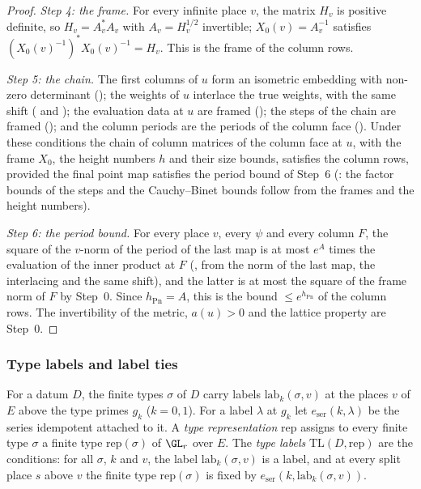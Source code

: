 \begin{proof}
\emph{Step 4: the frame.} For every infinite place $v$, the matrix $H_v$ is positive definite, so $H_v=A_v^*A_v$ with
$A_v=H_v^{1/2}$ invertible; $X_0(v)=A_v^{-1}$ satisfies $(X_0(v)^{-1})^*X_0(v)^{-1}=H_v$. This is the frame of the column rows.

\emph{Step 5: the chain.} The first columns of $u$ form an isometric embedding with non-zero determinant
(); the weights of $u$ interlace the true weights, with the same shift
( and );
the evaluation data at $u$ are framed (); the steps of the chain are framed
(); and the column periods are the periods of the column face
(). Under these conditions the chain of column matrices of the column face at $u$, with the
frame $X_0$, the height numbers $h$ and their size bounds, satisfies the column rows, provided the final point map satisfies the
period bound of Step~6 (: the factor bounds of the steps and the
Cauchy--Binet bounds follow from the frames and the height numbers).

\emph{Step 6: the period bound.} For every place $v$, every $\psi$ and every column $F$, the square of the $v$-norm of the period of
the last map is at most $e^{A}$ times the evaluation of the inner product at $F$
(, from the norm of the last map, the interlacing and the same shift), and the latter is
at most the square of the frame norm of $F$ by Step~0. Since $h_{\mathrm{Pn}}=A$, this is the bound
$\le e^{h_{\mathrm{Pn}}}$ of the column rows. The invertibility of the metric, $a(u)>0$ and the lattice property are Step~0.
\end{proof}

\subsubsection{Type labels and label ties}\label{sec:pf:open0:labels}

For a datum $D$, the finite types $\sigma$ of $D$ carry labels $\mathrm{lab}_k(\sigma,v)$ at the places $v$ of $E$ above the type
primes $g_k$ ($k=0,1$). For a label $\lambda$ at $g_k$ let $e_{\mathrm{ser}}(k,\lambda)$ be the series idempotent attached to it. A
\emph{type representation} $\mathrm{rep}$ assigns to every finite type $\sigma$ a finite type $\mathrm{rep}(\sigma)$ of $\GL_r$ over $E$.
The \emph{type labels} $\mathrm{TL}(D,\mathrm{rep})$ are the conditions: for all $\sigma$, $k$ and $v$, the label
$\mathrm{lab}_k(\sigma,v)$ is a label, and at every split place $s$ above $v$ the finite type $\mathrm{rep}(\sigma)$ is fixed by
$e_{\mathrm{ser}}(k,\mathrm{lab}_k(\sigma,v))$.

